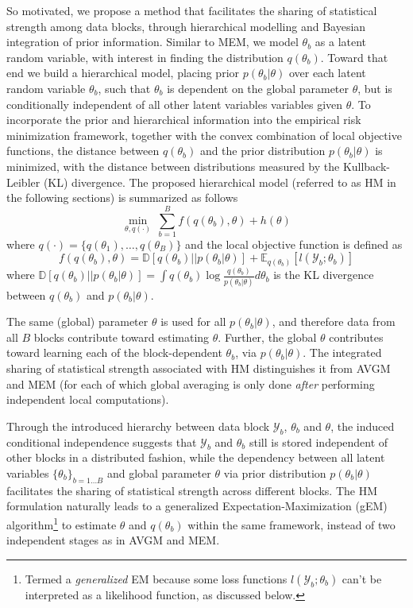 \documentclass{article}
\newcommand{\1}[0]{\ensuremath{\boldsymbol{1}}\xspace}
\begin{document}
So motivated, we propose a method that facilitates the sharing of statistical strength among data blocks, through hierarchical modelling and Bayesian integration of prior information. Similar to MEM, we model $\theta_b$ as a latent random variable, with interest in finding the distribution $q(\theta_b)$. Toward that end we build a hierarchical model, placing prior $p(\theta_b | \theta)$ over each latent random variable $\theta_b$, such that $\theta_b$ is dependent on the global parameter $\theta$, but is conditionally independent of all other latent variables variables given $\theta$. To incorporate the prior and hierarchical information into the empirical risk minimization framework, together with the convex combination of local objective functions, the distance between $q(\theta_b)$ and the prior distribution $p(\theta_b|\theta)$ is minimized, with the distance between distributions measured by the Kullback-Leibler (KL) divergence. The proposed hierarchical model (referred to as HM in the following sections) is summarized as follows
\begin{equation}\label{hm}
\textstyle \min_{\theta, q(\cdot)} ~ \sum_{b=1}^B f(q(\theta_b), \theta) + h(\theta)
\end{equation}
where $q(\cdot) = \{q(\theta_1), \ldots, q(\theta_B)\}$ and the local objective function is defined as
\begin{equation}\label{local_obj}
\textstyle f(q(\theta_b), \theta)  = \mathbb{D}[q(\theta_b)||p(\theta_b|\theta)] + \mathbb{E}_{q(\theta_b)}[l(\mathcal{Y}_b; \theta_b)]
\end{equation}
where $\mathbb{D}[q(\theta_b)||p(\theta_b|\theta)] = \int q(\theta_b)\log\frac{q(\theta_b)}{p(\theta_b|\theta)}d\theta_b$ is the KL divergence between $q(\theta_b)$ and $p(\theta_b|\theta)$. 

The same (global) parameter $\theta$ is used for all $p(\theta_b|\theta)$, and therefore data from all $B$ blocks contribute toward estimating $\theta$. Further, the global $\theta$ contributes toward learning each of the block-dependent $\theta_b$, via $p(\theta_b|\theta)$. The integrated sharing of statistical strength associated with HM distinguishes it from AVGM and MEM (for each of which global averaging is only done \emph{after} performing independent local computations).

Through the introduced hierarchy between data block $\mathcal{Y}_b$, $\theta_b$ and $\theta$, the induced conditional independence suggests that $\mathcal{Y}_b$ and $\theta_b$ still is stored independent of other blocks in a distributed fashion, while the dependency between all latent variables $\{\theta_b\}_{b=1\ldots B}$ and global parameter $\theta$ via prior distribution $p(\theta_b|\theta)$ facilitates the sharing of statistical strength across different blocks. The HM formulation naturally leads to a generalized Expectation-Maximization (gEM) algorithm\footnote{Termed a \emph{generalized} EM because some loss functions $l(\mathcal{Y}_b; \theta_b)$ can't be interpreted as a likelihood function, as discussed below.} to estimate $\theta$ and $q(\theta_b)$ within the same framework, instead of two independent stages as in AVGM and MEM.
\end{document}
